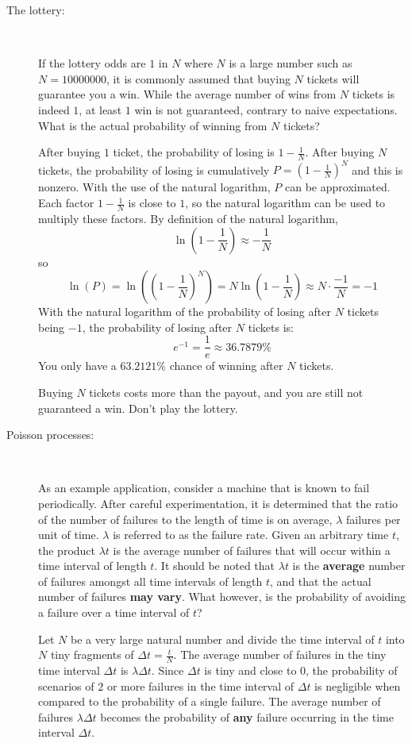 \documentclass{article}
\begin{document}
\begin{description}
\item[The lottery:] ~ 

If the lottery odds are \(1\) in \(N\) where \(N\) is a large number such as \(N = 10000000\), it is commonly assumed that buying \(N\) tickets will guarantee you a win. While the average number of wins from \(N\) tickets is indeed \(1\), at least \(1\) win is not guaranteed, contrary to naive expectations. What is the actual probability of winning from \(N\) tickets?

After buying \(1\) ticket, the probability of losing is \(1 - \frac{1}{N}\). After buying \(N\) tickets, the probability of losing is cumulatively \(P = \left(1 - \frac{1}{N}\right)^N\) and this is nonzero. With the use of the natural logarithm, \(P\) can be approximated. Each factor \(1 - \frac{1}{N}\) is close to \(1\), so the natural logarithm can be used to multiply these factors. By definition of the natural logarithm, 
\[\ln\left(1 - \frac{1}{N}\right) \approx -\frac{1}{N}\]
so 
\[\ln(P) = \ln\left(\left(1 - \frac{1}{N}\right)^N\right) = N\ln\left(1 - \frac{1}{N}\right) \approx N \cdot \frac{-1}{N} = -1\]
With the natural logarithm of the probability of losing after \(N\) tickets being \(-1\), the probability of losing after \(N\) tickets is: 
\[e^{-1} = \frac{1}{e} \approx 36.7879\%\]
You only have a \(63.2121\%\) chance of winning after \(N\) tickets. 

Buying \(N\) tickets costs more than the payout, and you are still not guaranteed a win. Don't play the lottery. 



\item[Poisson processes:] ~
 
As an example application, consider a machine that is known to fail periodically. After careful experimentation, it is determined that the ratio of the number of failures to the length of time is on average, \(\lambda\) failures per unit of time. \(\lambda\) is referred to as the failure rate. Given an arbitrary time \(t\), the product \(\lambda t\) is the average number of failures that will occur within a time interval of length \(t\). It should be noted that \(\lambda t\) is the {\bf average} number of failures amongst all time intervals of length \(t\), and that the actual number of failures {\bf may vary}. What however, is the probability of avoiding a failure over a time interval of \(t\)? 

Let \(N\) be a very large natural number and divide the time interval of \(t\) into \(N\) tiny fragments of \(\Delta t = \frac{t}{N}\). The average number of failures in the tiny time interval \(\Delta t\) is \(\lambda\Delta t\). Since \(\Delta t\) is tiny and close to \(0\), the probability of scenarios of \(2\) or more failures in the time interval of \(\Delta t\) is negligible when compared to the probability of a single failure. The average number of failures \(\lambda\Delta t\) becomes the probability of {\bf any} failure occurring in the time interval \(\Delta t\). 


\end{description}
\end{document}

